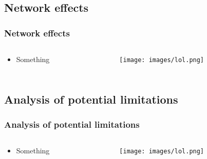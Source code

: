 \documentclass[aspectratio=43, fleqn]{beamer}
\begin{document}
\section[Network effects]{}
\subsection{Network effects}
\begin{frame}
\frametitle{Network effects}
\begin{columns} 
    \begin{column}{.4\textwidth}
    \vspace{-1.5cm}
    \begin{itemize}
        \item Something
    \end{itemize}
    \end{column}
    \begin{column}{.6\textwidth}
        \vspace{-0.8cm}
        \begin{center}
            \texttt{[image: images/lol.png]}
        \end{center}
    \end{column}
\end{columns}
\end{frame}

\section[Analysis of potential limitations]{}
\subsection{Analysis of potential limitations}
\begin{frame}
\frametitle{Analysis of potential limitations}
\begin{columns} 
    \begin{column}{.4\textwidth}
    \vspace{-1.5cm}
    \begin{itemize}
        \item Something
    \end{itemize}
    \end{column}
    \begin{column}{.6\textwidth}
        \vspace{-0.8cm}
        \begin{center}
            \texttt{[image: images/lol.png]}
        \end{center}
    \end{column}
\end{columns}
\end{frame}
\end{document}
